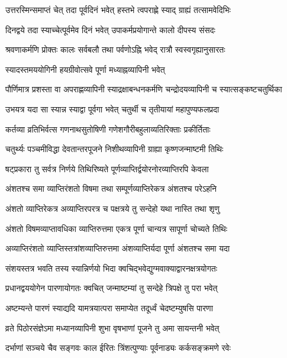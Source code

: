 \twolineshloka
{उत्तरस्मिन्समाप्तं चेत् तदा पूर्वदिनं भवेत्}
{हस्तभे त्वपराह्णे स्याद् ग्राह्यं तत्सामवेदिभिः} %

\twolineshloka
{दिनद्वये तदा स्याच्चेत्पूर्वमेव दिनं भवेत्}
{उपाकर्मप्रयोगान्ते कालो दीपस्य संसदः} %

\twolineshloka
{श्रवणाकर्मणि प्रोक्तः कालः सर्वबलौ तथा}
{पर्वणोऽह्नि भवेद् रात्रौ स्वस्वगृह्यानुसारतः} %

\twolineshloka
{स्यादस्तमययोगिनी}
{हयग्रीवोत्सवे पूर्णा मध्याह्नव्यापिनी भवेत्} %

\twolineshloka
{पौर्णिमात्र प्रशस्ता वा अपराह्णव्यापिनी स्याद्रक्षाबन्धनकर्मणि}
{चन्द्रोदयव्यापिनी च स्यात्सङ्कष्टचतुर्थिका} %

\twolineshloka
{उभयत्र यदा सा स्यान्न स्याद्वा पूर्वगा भवेत्}
{चतुर्थी च तृतीयायां महापुण्यफलप्रदा} %

\twolineshloka
{कर्तव्या व्रतिभिर्वत्स गणनाथसुतोषिणी}
{गणेशगौरीबहुलाव्यतिरिक्ताः प्रकीर्तिताः} %

\twolineshloka
{चतुर्थ्यः पञ्चमीविद्धा देवतान्तरपूजने}
{निशीथव्यापिनी ग्राह्या कृष्णजन्माष्टमी तिथिः} %

\twolineshloka
{षट्प्रकारा तु सर्वत्र निर्णये तिथिरिष्यते}
{पूर्णव्याप्तिर्द्वयोरनोरव्याप्तिरपि केवला} %

\twolineshloka
{अंशतश्च समा व्याप्तिरंशतो विषमा तथा}
{सम्पूर्णव्याप्तिरेकत्र अंशतश्च परेऽहनि} %

\twolineshloka
{अंशतो व्याप्तिरेकत्र अव्याप्तिरपरत्र च}
{पक्षत्रये तु सन्देहो यथा नास्ति तथा शृणु} %

\twolineshloka
{अंशतो विषमव्याप्तावधिका व्याप्तिरुत्तमा}
{एकत्र पूर्णा चान्यत्र सापूर्णा चोच्यते तिथिः} %

\twolineshloka
{अव्याप्तिरंशतो व्याप्तिस्तत्रांशव्याप्तिरुत्तमा}
{अंशव्याप्तिर्यदा पूर्णा अंशतश्च समा यदा} %

\twolineshloka
{संशयस्तत्र भवति तस्य स्यान्निर्णयो भिदा}
{क्वचिद्भवेद्युग्मवाक्याद्वारनक्षत्रयोगतः } %

\twolineshloka
{प्रधानद्वययोगेन पारणायोगतः क्वचित्}
{जन्माष्टम्यां तु सन्देहे त्रिपक्षे तु परा भवेत्} %

\twolineshloka
{अष्टम्यन्ते पारणं स्याद्यदि यामत्रयात्परा}
{समाप्येत तदूर्ध्वं चेदष्टम्युषसि पारणा} %

\twolineshloka
{व्रते पिठोरसंज्ञेऽमा मध्यानव्यापिनी शुभा}
{वृषभाणां पूजने तु अमा सायन्तनी भवेत्} %

\twolineshloka
{दर्भाणां सञ्चये चैव सङ्गवः काल ईरितः}
{त्रिंशत्पुण्याः पूर्वनाड्यः कर्कसङ्क्रमणे रवेः} %

